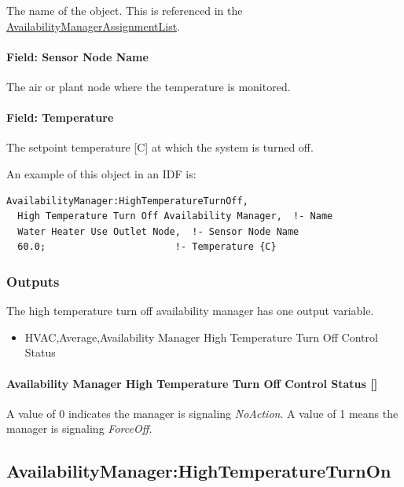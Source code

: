 The name of the object. This is referenced in the \hyperref[availabilitymanagerassignmentlist]{AvailabilityManagerAssignmentList}.

\paragraph{Field: Sensor Node Name}\label{field-sensor-node-name-002}

The air or plant node where the temperature is monitored.

\paragraph{Field: Temperature}\label{field-temperature}

The setpoint temperature {[}C{]} at which the system is turned off.

An example of this object in an IDF is:

\begin{lstlisting}
AvailabilityManager:HighTemperatureTurnOff,
  High Temperature Turn Off Availability Manager,  !- Name
  Water Heater Use Outlet Node,  !- Sensor Node Name
  60.0;                       !- Temperature {C}
\end{lstlisting}

\subsubsection{Outputs}\label{outputs-4-017}

The high temperature turn off availability manager has one output variable.

\begin{itemize}
\tightlist
\item
  HVAC,Average,Availability Manager High Temperature Turn Off Control Status
\end{itemize}

\paragraph{Availability Manager High Temperature Turn Off Control Status {[]}}\label{availability-manager-high-temperature-turn-off-control-status}

A value of 0 indicates the manager is signaling \emph{NoAction}. A value of 1 means the manager is signaling \emph{ForceOff.}

\subsection{AvailabilityManager:HighTemperatureTurnOn}\label{availabilitymanagerhightemperatureturnon}


